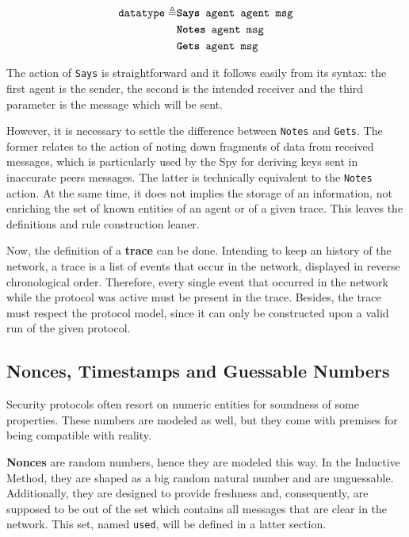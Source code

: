 \begin{equation*}
  \begin{split}
    \texttt{datatype} \triangleq
    & \texttt{\textbf{Says} agent agent msg} \\
    & \texttt{\textbf{Notes} agent msg} \\
    & \texttt{\textbf{Gets} agent msg}
  \end{split}
\end{equation*}

The action of \texttt{Says} is straightforward and it follows easily from its syntax: the first agent is the sender, the second is the intended receiver and the third parameter is the message which will be sent.

However, it is necessary to settle the difference between \texttt{Notes} and \texttt{Gets}. The former relates to the action of noting down fragments of data from received messages, which is particularly used by the Spy for deriving keys sent in inaccurate peers messages. The latter is technically equivalent to the \texttt{Notes} action. At the same time, it does not implies the storage of an information, not enriching the set of known entities of an agent or of a given trace. This leaves the definitions and rule construction leaner.

Now, the definition of a \textbf{trace} can be done. Intending to keep an history of the network, a trace is a list of events that occur in the network, displayed in reverse chronological order. Therefore, every single event that occurred in the network while the protocol was active must be present in the trace. Besides, the trace must respect the protocol model, since it can only be constructed upon a valid run of the given protocol.

\subsection{Nonces, Timestamps and Guessable Numbers}
Security protocols often resort on numeric entities for soundness of some properties. These numbers are modeled as well, but they come with premises for being compatible with reality.

\textbf{Nonces} are random numbers, hence they are modeled this way. In the Inductive Method, they are shaped as a big random natural number and are unguessable. Additionally, they are designed to provide freshness and, consequently, are supposed to be out of the set which contains all messages that are clear in the network. This set, named \texttt{used}, will be defined in a latter section.

